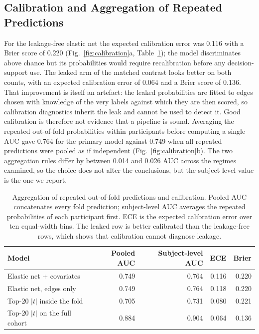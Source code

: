 \documentclass[runningheads]{llncs}
\begin{document}
\subsection{Calibration and Aggregation of Repeated Predictions}
For the leakage-free elastic net the expected calibration error was 0.116 with a Brier
score of 0.220 (Fig.~\ref{fig:calibration}a, Table~\ref{tab:calibration}); the model
discriminates above chance but its probabilities would require recalibration before any
decision-support use. The leaked arm of the matched contrast looks better on both counts,
with an expected calibration error of 0.064 and a Brier score of 0.136. That improvement
is itself an artefact: the leaked probabilities are fitted to edges chosen with knowledge
of the very labels against which they are then scored, so calibration diagnostics inherit
the leak and cannot be used to detect it. Good calibration is therefore not evidence that
a pipeline is sound. Averaging the repeated out-of-fold probabilities
within participants before computing a single AUC gave 0.764 for the primary model
against 0.749 when all repeated predictions were pooled as if independent
(Fig.~\ref{fig:calibration}b). The two aggregation rules differ by between 0.014 and
0.026 AUC across the regimes examined, so the choice does not alter the conclusions, but
the subject-level value is the one we report.

\begin{table}[t]
\centering
\caption{Aggregation of repeated out-of-fold predictions and calibration. Pooled AUC
concatenates every fold prediction; subject-level AUC averages the repeated probabilities
of each participant first. ECE is the expected calibration error over ten equal-width
bins. The leaked row is better calibrated than the leakage-free rows, which shows that
calibration cannot diagnose leakage.}
\label{tab:calibration}
\begin{tabular}{lrrrr}
\toprule
Model & Pooled AUC & Subject-level AUC & ECE & Brier \\
\midrule
Elastic net + covariates      & 0.749 & 0.764 & 0.116 & 0.220 \\
Elastic net, edges only       & 0.749 & 0.764 & 0.118 & 0.220 \\
Top-20 $|t|$ inside the fold    & 0.705 & 0.731 & 0.080 & 0.221 \\
Top-20 $|t|$ on the full cohort & 0.884 & 0.904 & 0.064 & 0.136 \\
\bottomrule
\end{tabular}
\end{table}
\end{document}
